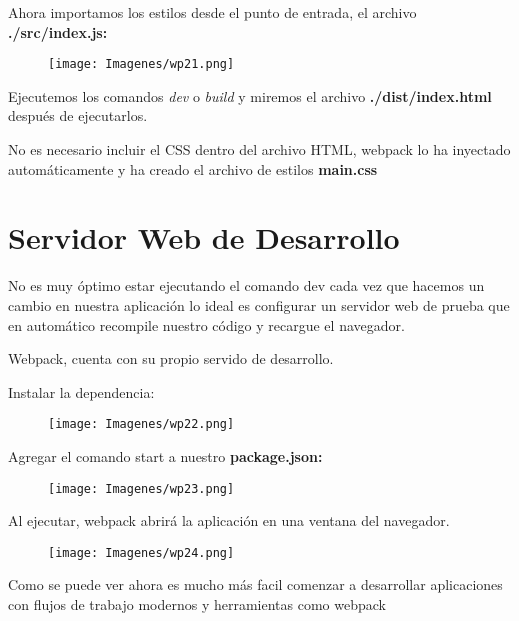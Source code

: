 \item Ahora importamos los estilos desde el punto de entrada, el archivo \textbf{./src/index.js:}
\begin{figure}[h]
   \centering
    \texttt{[image: Imagenes/wp21.png]}
    \label{fig:my_label}
\end{figure}

\item Ejecutemos los comandos \textit{dev} o \textit{build} y miremos el archivo \textbf{./dist/index.html} después de ejecutarlos.

\item No es necesario incluir el CSS dentro del archivo HTML, webpack lo ha inyectado automáticamente y ha creado el archivo de estilos \textbf{main.css}


\section{Servidor Web de Desarrollo}
\item No es muy óptimo estar ejecutando el comando dev cada vez que hacemos un cambio en nuestra aplicación lo ideal es configurar un servidor web de prueba que en automático recompile nuestro código y recargue el navegador.

\item Webpack, cuenta con su propio servido de desarrollo.
\item Instalar la dependencia:
\begin{figure}[h]
   \centering
    \texttt{[image: Imagenes/wp22.png]}
    \label{fig:my_label}
\end{figure}

\newpage
\item Agregar el comando start a nuestro \textbf{package.json:}
\begin{figure}[h]
   \centering
    \texttt{[image: Imagenes/wp23.png]}
    \label{fig:my_label}
\end{figure}

\item Al ejecutar, webpack abrirá la aplicación en una ventana del navegador.
\begin{figure}[h]
   \centering
    \texttt{[image: Imagenes/wp24.png]}
    \label{fig:my_label}
\end{figure}

\item Como se puede ver  ahora es mucho más facil comenzar a desarrollar aplicaciones con flujos de trabajo modernos y herramientas como webpack

